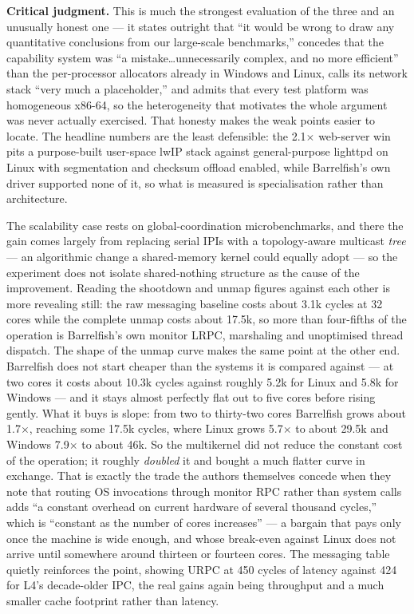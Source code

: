 \textbf{Critical judgment.} This is much the strongest evaluation of the three and an
unusually honest one --- it states outright that ``it would be wrong to draw any quantitative
conclusions from our large-scale benchmarks,'' concedes that the capability system was ``a
mistake\ldots unnecessarily complex, and no more efficient'' than the per-processor allocators
already in Windows and Linux, calls its network stack ``very much a placeholder,'' and admits
that every test platform was homogeneous x86-64, so the heterogeneity that motivates the
whole argument was never actually exercised. That honesty makes the weak points easier to
locate. The headline numbers are the least defensible: the 2.1$\times$ web-server win pits a
purpose-built user-space lwIP stack against general-purpose lighttpd on Linux with
segmentation and checksum offload enabled, while Barrelfish's own driver supported none of
it, so what is measured is specialisation rather than architecture.

The scalability case
rests on global-coordination microbenchmarks, and there the gain comes largely from replacing
serial IPIs with a topology-aware multicast \emph{tree} --- an algorithmic change a
shared-memory kernel could equally adopt --- so the experiment does not isolate shared-nothing
structure as the cause of the improvement. Reading the shootdown and unmap figures against
each other is more revealing still: the raw messaging baseline costs about 3.1k cycles at 32
cores while the complete unmap costs about 17.5k, so more than four-fifths of the operation is
Barrelfish's own monitor LRPC, marshaling and unoptimised thread dispatch. The shape of the
unmap curve makes the same point at the other end. Barrelfish does not start cheaper than the
systems it is compared against --- at two cores it costs about 10.3k cycles against roughly
5.2k for Linux and 5.8k for Windows --- and it stays almost perfectly flat out to five cores
before rising gently. What it buys is slope: from two to thirty-two cores Barrelfish grows
about 1.7$\times$, reaching some 17.5k cycles, where Linux grows 5.7$\times$ to about 29.5k
and Windows 7.9$\times$ to about 46k. So the multikernel did not reduce the constant cost of
the operation; it roughly \emph{doubled} it and bought a much flatter curve in exchange. That
is exactly the trade the authors themselves concede when they note that routing OS invocations
through monitor RPC rather than system calls adds ``a constant overhead on current hardware of
several thousand cycles,'' which is ``constant as the number of cores increases'' --- a
bargain that pays only once the machine is wide enough, and whose break-even against Linux
does not arrive until somewhere around thirteen or fourteen cores. The messaging table quietly reinforces
the point, showing URPC at 450 cycles of latency against 424 for L4's decade-older IPC, the
real gains again being throughput and a much smaller cache footprint rather than latency.

